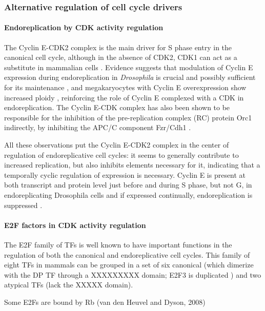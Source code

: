 \documentclass[11pt,twoside,a4paper]{report}
\begin{document}
			\subsubsection{Alternative regulation of cell cycle drivers}
			
				\paragraph{Endoreplication by CDK activity regulation}
			
				The Cyclin E-CDK2 complex is the main driver for S phase entry in the canonical cell cycle, although in the absence of CDK2, CDK1 can act as a substitute in mammalian cells \cite{Ullah2009}. Evidence suggests that modulation of Cyclin E expression during endoreplication in \textit{Drosophila} is crucial and possibly sufficient for its maintenance \cite{Lilly2005}, and megakaryocytes with Cyclin E overexpression show increased ploidy \cite{Eliades2010}, reinforcing the role of Cyclin E complexed with a CDK in endoreplication. The Cyclin E-CDK complex has also been shown to be responsible for the inhibition of the pre-replication complex (RC) protein Orc1 indirectly, by inhibiting the APC/C component  Fzr/Cdh1 \cite{Narbonne-Reveau2008}.
			
				All these observations put the Cyclin E-CDK2 complex in the center of regulation of endoreplicative cell cycles: it seems to generally contribute to increased replication, but also inhibits elements necessary for it, indicating that a temporally cyclic regulation of expression is necessary. Cyclin E is present at both transcript and protein level just before and during S phase, but not G, in endoreplicating Drosophila cells \cite{Weng2003} and if expressed continually, endoreplication is suppressed \cite{Weiss}.
			
				\paragraph{E2F factors in CDK activity regulation}
				\label{paragraph:E2Fs}
			
				 The E2F family of TFs is well known to have important functions in the regulation of both the canonical and endoreplicative cell cycles. This family of eight TFs in mammals can be grouped in a set of six canonical (which dimerize with the DP TF through a XXXXXXXXX domain; E2F3 is duplicated ) and two atypical TFs (lack the XXXXX domain).
							
				Some E2Fs are bound by Rb (van den Heuvel and Dyson, 2008)
			
\end{document}
